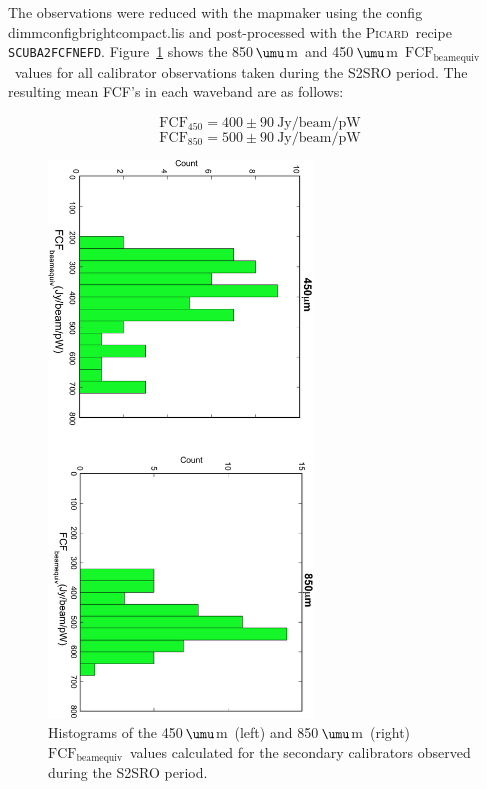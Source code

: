 \documentclass[twoside,11pt]{article}
\newcommand{\micron}{\mbox{\,${\umu}$m}}            %
\newcommand{\xref}[3]{#1}
\renewcommand{\_}{\texttt{\symbol{95}}}
\newcommand{\fcfbe}{$\mathrm{FCF_{beamequiv}}$}
\newcommand{\picard}{\xref{\textsc{Picard}}{sun231}{}}
\newcommand{\drrecipe}[1]{\texttt{#1}}
\begin{document}
The observations were reduced with the mapmaker using the config
dimmconfig\_bright\_compact.lis and post-processed with the \picard\
recipe \drrecipe{SCUBA2\_FCFNEFD}. Figure~\ref{fig:fcfs} shows the 850\micron\ and
450\micron\ \fcfbe\ values for all calibrator observations taken
during the S2SRO period. The resulting mean FCF's in each waveband
are as follows:

\begin{equation}
\mathrm{FCF}_{450} = 400 \pm 90 ~\mathrm{Jy/beam/pW}
\end{equation}
\begin{equation}
\mathrm{FCF}_{850} = 500 \pm 90 ~\mathrm{Jy/beam/pW}
\end{equation}

\begin{figure}
\begin{center}
\includegraphics[width=7cm,angle=90]{sc19_fcf_hist}
\caption{Histograms of the 450\micron\ (left) and 850\micron\ (right)
  \fcfbe\ values calculated for the secondary calibrators observed
  during the S2SRO period.}
\label{fig:fcfs}
\end{center}
\end{figure}
\end{document}

